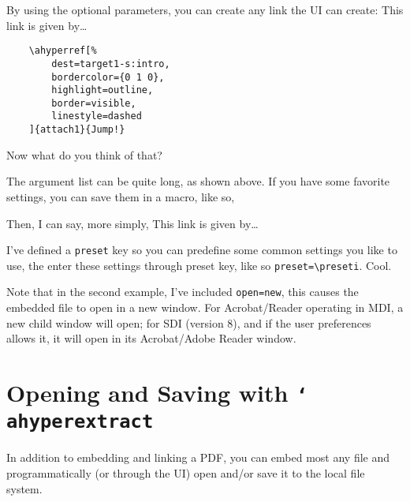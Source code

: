 \documentclass{article}
\newcommand{\cs}[1]{\texttt{\char`\\#1}}
\newcommand\newtopic{\par\ifdim\lastskip>0pt\relax\vskip-\lastskip\fi
\par\vskip6pt\noindent}
\def\aftersverbskip{\noindent}
\newenvironment{sverbatim}
{\par\small\verbatim}
{\endverbatim\par\aftergroup\aftersverbskip}
\def\preseti{bordercolor={0 0 1},highlight=outline,border=visible,linestyle=dashed,open=new}
\begin{document}
By using the optional parameters, you can create any link the UI can create:
This link is given by\dots
\begin{verbatim}
    \ahyperref[%
        dest=target1-s:intro,
        bordercolor={0 1 0},
        highlight=outline,
        border=visible,
        linestyle=dashed
    ]{attach1}{Jump!}
\end{verbatim}
\noindent Now what do you think of that?

\newtopic The argument list can be quite long, as shown above. If you have some favorite settings, you can
save them in a macro, like so,
\begin{sverbatim}
    \def\preseti{bordercolor={0 0 1},highlight=outline,open=new,%
        border=visible,linestyle=dashed}
\end{sverbatim}
\noindent Then, I can say, more simply, \ahyperref[dest=target1-s:intro,preset=\preseti]{attach1}{Jump!}
This link is given by\dots
\begin{sverbatim}
\ahyperref[dest=target1-s:intro,preset=\preseti]{attach1}{Jump!}
\end{sverbatim}
\noindent I've defined a \texttt{preset} key so you can predefine some common settings you like to use,
the enter these settings through preset key, like so \verb!preset=\preseti!. Cool.

Note that in the second example, I've included \texttt{open=new}, this causes the embedded file to open
in a new window. For Acrobat/Reader operating in MDI, a new child window will open; for SDI (version 8),
and if the user preferences allows it, it will open in its Acrobat/Adobe Reader window.

\newtopic
{}

\section{Opening and Saving with \texorpdfstring{\protect\cs{ahyperextract}}
    {\textbackslash ahyperextract}}

In addition to embedding and linking a PDF, you can embed most any
file and programmatically (or through the UI) open and/or save it to
the local file system.
\end{document}
